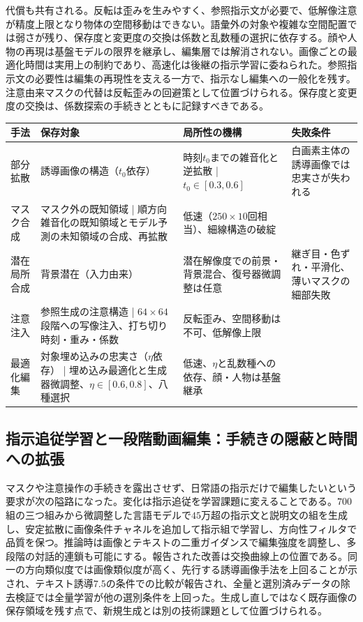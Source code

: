 \documentclass[lualatex,a4paper,10pt]{jlreq}
\begin{document}
代償も共有される。反転は歪みを生みやすく、参照指示文が必要で、低解像注意が精度上限となり物体の空間移動はできない\autocite{btd047}。語彙外の対象や複雑な空間配置では弱さが残り、保存度と変更度の交換は係数と乱数種の選択に依存する\autocite{btd047,btd048}。顔や人物の再現は基盤モデルの限界を継承し、編集層では解消されない\autocite{btd048}。画像ごとの最適化時間は実用上の制約であり、高速化は後継の指示学習に委ねられた\autocite{btd048}。参照指示文の必要性は編集の再現性を支える一方で、指示なし編集への一般化を残す\autocite{btd047}。注意由来マスクの代替は反転歪みの回避策として位置づけられる\autocite{btd047}。保存度と変更度の交換は、係数探索の手続きとともに記録すべきである\autocite{btd047,btd048}。

\begin{center}
\small
\begin{tabularx}{\textwidth}{@{}p{}p{}p{}X@{}}
\toprule
手法 & 保存対象 & 局所性の機構 & 失敗条件 \\
\midrule
部分拡散\autocite{btd044} & 誘導画像の構造（$t_0$依存） & 時刻$t_0$までの雑音化と逆拡散 | $t_0 \in [0.3, 0.6]$ & 白画素主体の誘導画像では忠実さが失われる \\
マスク合成\autocite{btd045} & マスク外の既知領域 | 順方向雑音化の既知領域とモデル予測の未知領域の合成、再拡散 & 低速（$250 \times 10$回相当）、細線構造の破綻 \\
潜在局所合成\autocite{btd046} & 背景潜在（入力由来） & 潜在解像度での前景・背景混合、復号器微調整は任意 & 継ぎ目・色ずれ・平滑化、薄いマスクの細部失敗 \\
注意注入\autocite{btd047} & 参照生成の注意構造 | $64 \times 64$段階への写像注入、打ち切り時刻・重み・係数 & 反転歪み、空間移動は不可、低解像上限 \\
最適化編集\autocite{btd048} & 対象埋め込みの忠実さ（$\eta$依存） | 埋め込み最適化と生成器微調整、$\eta \in [0.6, 0.8]$、八種選択 & 低速、$\eta$と乱数種への依存、顔・人物は基盤継承 \\
\bottomrule
\end{tabularx}
\end{center}

\subsection{指示追従学習と一段階動画編集：手続きの隠蔽と時間への拡張}
マスクや注意操作の手続きを露出させず、日常語の指示だけで編集したいという要求が次の隘路になった\autocite{btd049}。変化は指示追従を学習課題に変えることである。$700$組の三つ組みから微調整した言語モデルで$45$万超の指示文と説明文の組を生成し、安定拡散に画像条件チャネルを追加して指示組で学習し、方向性フィルタで品質を保つ\autocite{btd049}。推論時は画像とテキストの二重ガイダンスで編集強度を調整し、多段階の対話的連鎖も可能にする。報告された改善は交換曲線上の位置である。同一の方向類似度では画像類似度が高く、先行する誘導画像手法を上回ることが示され、テキスト誘導$7.5$の条件での比較が報告され、全量と選別済みデータの除去検証では全量学習が他の選別条件を上回った\autocite{btd049}。生成し直しではなく既存画像の保存領域を残す点で、新規生成とは別の技術課題として位置づけられる\autocite{btd049}。
\end{document}
